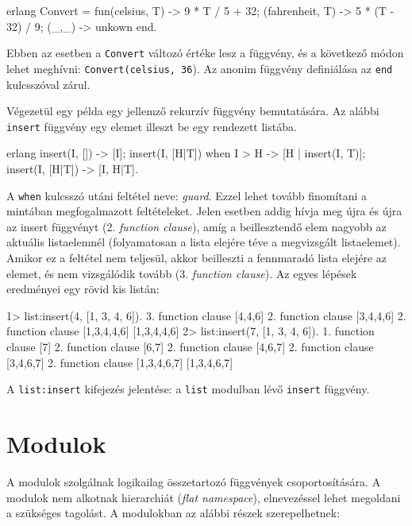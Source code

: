 \documentclass[12pt, a4paper, oneside]{book}
\begin{document}
\begin{code}{erlang}{}
Convert = fun(celsius, T) ->
                  9 * T / 5 + 32;
             (fahrenheit, T) ->
                  5 * (T - 32) / 9;
             (_,_) ->
                  unkown
          end.
\end{code}

Ebben az esetben a \texttt{Convert} változó értéke lesz a függvény, és a következő módon
lehet meghívni: \texttt{Convert(celsius, 36}). Az anonim függvény definiálása
az \texttt{end} kulcsszóval zárul.

Végezetül egy példa egy jellemző rekurzív függvény bemutatására. Az alábbi
\texttt{insert} függvény egy elemet illeszt be egy rendezett listába.

\begin{code}{erlang}{}
insert(I, []) ->
  [I];
insert(I, [H|T]) when I > H ->
  [H | insert(I, T)];
insert(I, [H|T]) ->
  [I, H|T].
\end{code}

\noindent A \texttt{when} kulcsszó utáni feltétel neve: \emph{guard}. Ezzel
lehet tovább finomítani a mintában megfogalmazott feltételeket. Jelen esetben
addig hívja meg újra és újra az insert függvényt (2. \emph{function clause}),
amíg a beillesztendő elem nagyobb az aktuális listaelemnél (folyamatosan a
lista elejére téve a megvizsgált listaelemet). Amikor ez a feltétel nem
teljesül, akkor beilleszti a fennmaradó lista elejére az elemet, és nem
vizsgálódik tovább (3.  \emph{function clause}). Az egyes lépések eredményei
egy rövid kis listán:

\begin{code}{}{}
1> list:insert(4, [1, 3, 4, 6]).
3. function clause [4,4,6]
2. function clause [3,4,4,6]
2. function clause [1,3,4,4,6]
[1,3,4,4,6]
2> list:insert(7, [1, 3, 4, 6]).
1. function clause [7]
2. function clause [6,7]
2. function clause [4,6,7]
2. function clause [3,4,6,7]
2. function clause [1,3,4,6,7]
[1,3,4,6,7]
\end{code}

\noindent A \texttt{list:insert} kifejezés jelentése: a \texttt{list} modulban
lévő \texttt{insert} függvény. 

\section{Modulok} A modulok szolgálnak logikailag összetartozó függvények
csoportosítására. A modulok nem alkotnak hierarchiát (\emph{flat namespace}),
elnevezéssel lehet megoldani a szükséges tagolást. A modulokban az alábbi
részek szerepelhetnek:
\end{document}
